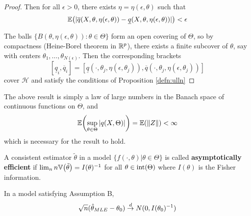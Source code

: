 \begin{proof}
  Then for all $\epsilon > 0$, there exists $\eta = \eta(\epsilon,
  \theta)$ such that
  \begin{equation}
    \label{eq:58}
    \E{|\overline q(X, \theta, \eta(\epsilon, \theta)) - \underline
      q(X, \theta, \eta(\epsilon, \theta))|} < \epsilon
  \end{equation}

  The balls $\{ B(\theta, \eta(\epsilon, \theta)) : \theta \in \Theta
  \}$ form an open covering of $\Theta$, so by compactness
  (Heine-Borel theorem in $\mathbb{R}^{p}$), there exists a finite subcover of
  $\theta$, say with centers $\theta_{1}, \dots,
  \theta_{N(\epsilon)}$.  Then the corresponding brackets
  \begin{equation}
    \label{eq:59}
    [\underline q_{i}, \overline q_{i}] = [ \underline q(\cdot,
    \theta_{j}, \eta(\epsilon, \theta_{j})), \overline q(\cdot,
    \theta_{j}, \eta(\epsilon, \theta_{j}))]
  \end{equation} cover $\mathcal{H}$ and satisfy the conditions of
  Proposition \ref{defn:ulln}
\end{proof}

\begin{remark}
  The above result is simply a law of large numbers in the Banach
  space of continuous functions on $\Theta$, and
  \begin{equation}
    \label{eq:60}
    \E{\sup_{\theta \in \Theta} | q(X, \Theta) |} = \E{\|Z\|} < \infty
  \end{equation} which is necessary for the result to hold.
\end{remark}


\begin{defn}
  \label{defn:parametric_statistical_models:6}
  A consistent estimator $\tilde \theta$ in a model $\{ f(\cdot,
  \theta) | \theta \in \Theta \}$ is called \textbf{asymptotically
    efficient} if $\lim_{n} n \Var{\tilde \theta} = I(\theta)^{-1}$
  for all $\theta \in \operatorname*{int} (\Theta)$ where $I(\theta)$ is the Fisher information.
\end{defn}

\begin{thm}
  \label{defn:parametric_statistical_models:7}
  In a model satisfying Assumption B,
  \begin{equation}
    \label{eq:39}
    \sqrt{n} (\hat \theta_{MLE} - \theta_{0}) \overset{d}{\rightarrow} N(0, I(\theta_{0})^{-1})
  \end{equation}
\end{thm}

